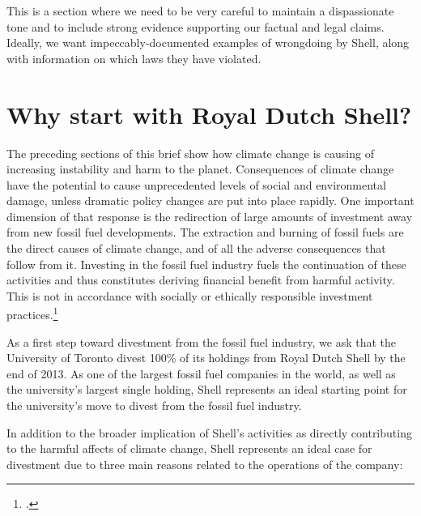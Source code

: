 


\begin{vcom}
	This is a section where we need to be very careful to maintain a dispassionate tone and to include strong evidence supporting our factual and legal claims. Ideally, we want impeccably-documented examples of wrongdoing by Shell, along with information on which laws they have violated.
\end{vcom}



		\section{Why start with Royal Dutch Shell?}



The preceding sections of this brief show how climate change is causing of increasing instability and harm to the planet.
Consequences of climate change have the potential to cause unprecedented levels of social and environmental damage, unless dramatic policy changes are put into place rapidly. 
One important dimension of that response is the redirection of large amounts of investment away from new fossil fuel developments.
The extraction and burning of fossil fuels are the direct causes of climate change, and of all the adverse consequences that follow from it. 
Investing in the fossil fuel industry fuels the continuation of these activities and thus constitutes deriving financial benefit from harmful activity.
This is not in accordance with socially or ethically responsible investment practices.\footcite[][]{Richardson_2008}



As a first step toward divestment from the fossil fuel industry, we ask that the University of Toronto divest 100\% of its holdings from Royal Dutch Shell by the end of 2013. 
As one of the largest fossil fuel companies in the world, as well as the university's largest single holding, Shell represents an ideal starting point for the university's move to divest from the fossil fuel industry.
		

			
In addition to the broader implication of Shell's activities as directly contributing to the harmful affects of climate change, Shell represents an ideal case for divestment due to three main reasons  related to the operations of the company: 



